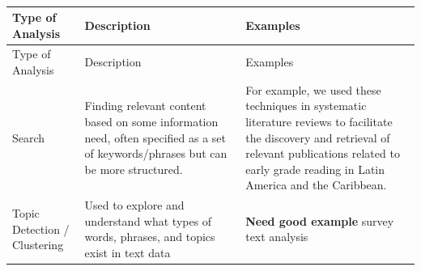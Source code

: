 \documentclass[]{krantz}
\begin{document}
\begin{longtable}[]{@{}lll@{}}
\caption{\label{tab:table7-0}}\tabularnewline
\toprule
\begin{minipage}[b]{0.12\columnwidth}\raggedright\strut
Type of Analysis\strut
\end{minipage} & \begin{minipage}[b]{0.16\columnwidth}\raggedright\strut
Description\strut
\end{minipage} & \begin{minipage}[b]{0.63\columnwidth}\raggedright\strut
Examples\strut
\end{minipage}\tabularnewline
\midrule
\endfirsthead
\toprule
\begin{minipage}[b]{0.12\columnwidth}\raggedright\strut
Type of Analysis\strut
\end{minipage} & \begin{minipage}[b]{0.16\columnwidth}\raggedright\strut
Description\strut
\end{minipage} & \begin{minipage}[b]{0.63\columnwidth}\raggedright\strut
Examples\strut
\end{minipage}\tabularnewline
\midrule
\endhead
\begin{minipage}[t]{0.12\columnwidth}\raggedright\strut
Search\strut
\end{minipage} & \begin{minipage}[t]{0.16\columnwidth}\raggedright\strut
Finding relevant content based on some information need, often specified
as a set of keywords/phrases but can be more structured.\strut
\end{minipage} & \begin{minipage}[t]{0.63\columnwidth}\raggedright\strut
For example, we used these techniques in systematic literature reviews
to facilitate the discovery and retrieval of relevant publications
related to early grade reading in Latin America and the Caribbean.\strut
\end{minipage}\tabularnewline
\begin{minipage}[t]{0.12\columnwidth}\raggedright\strut
Topic Detection / Clustering\strut
\end{minipage} & \begin{minipage}[t]{0.16\columnwidth}\raggedright\strut
Used to explore and understand what types of words, phrases, and topics
exist in text data\strut
\end{minipage} & \begin{minipage}[t]{0.63\columnwidth}\raggedright\strut
\textbf{Need good example} survey text analysis\strut

\end{minipage}
\end{longtable}
\end{document}

